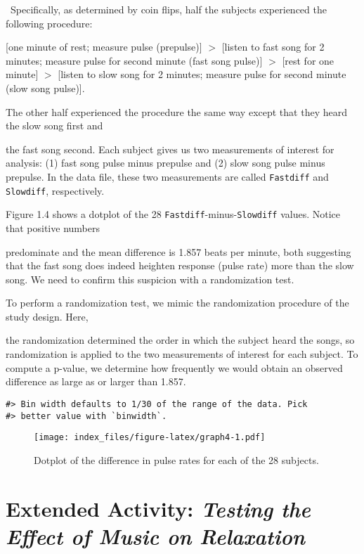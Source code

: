 \documentclass[
]{report}
\theoremstyle{definition}
\theoremstyle{definition}
\theoremstyle{definition}
\theoremstyle{definition}
\theoremstyle{remark}
\begin{document}
\normalsize

~Specifically, as determined by coin flips, half the subjects experienced the following procedure:

{[}one minute of rest; measure pulse (prepulse){]} \(>\) {[}listen to fast song for 2 minutes; measure pulse
for second minute (fast song pulse){]} \(>\) {[}rest for one minute{]} \(>\) {[}listen to slow song for 2 minutes;
measure pulse for second minute (slow song pulse){]}.

The other half experienced the procedure the same way except that they heard the slow song first and

the fast song second.
\textbar{} Each subject gives us two measurements of interest for analysis: (1) fast song pulse minus prepulse
and (2) slow song pulse minus prepulse. In the data file, these two measurements are called \texttt{Fastdiff} and
\texttt{Slowdiff}, respectively.

Figure 1.4 shows a dotplot of the 28 \texttt{Fastdiff}-minus-\texttt{Slowdiff} values. Notice that positive numbers

predominate and the mean difference is 1.857 beats per minute, both suggesting that the fast song does indeed
heighten response (pulse rate) more than the slow song. We need to confirm this suspicion with a randomization
test.

To perform a randomization test, we mimic the randomization procedure of the study design. Here,

the randomization determined the order in which the subject heard the songs, so randomization is applied
to the two measurements of interest for each subject. To compute a p-value, we determine how frequently
we would obtain an observed difference as large as or larger than 1.857.

\begin{verbatim}
#> Bin width defaults to 1/30 of the range of the data. Pick
#> better value with `binwidth`.
\end{verbatim}

\begin{figure}
\centering
\texttt{[image: index\_files/figure-latex/graph4-1.pdf]}
\caption{\label{fig:graph4}Dotplot of the difference in pulse rates for each of the 28 subjects.}
\end{figure}

\hypertarget{extended-activity-testing-the-effect-of-music-on-relaxation}{%
\section*{\texorpdfstring{Extended Activity: \emph{Testing the Effect of Music on Relaxation}}{Extended Activity: Testing the Effect of Music on Relaxation}}\label{extended-activity-testing-the-effect-of-music-on-relaxation}}
\end{document}
